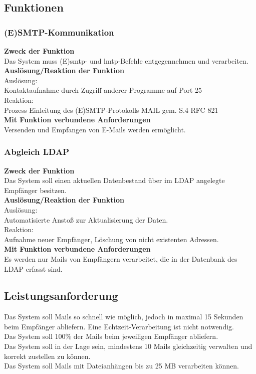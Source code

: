 \subsection{Funktionen}
\subsubsection{(E)SMTP-Kommunikation}
\textbf{Zweck der Funktion} \\
Das System muss (E)\ac{smtp}- und \ac{lmtp}-Befehle entgegennehmen und verarbeiten. \\
\textbf{Auslösung/Reaktion der Funktion} \\
Auslösung: \\
Kontaktaufnahme durch Zugriff anderer Programme auf Port 25\\
Reaktion:\\
Prozess Einleitung des (E)SMTP-Protokolls MAIL gem. S.4 RFC 821 \\
\textbf{Mit Funktion verbundene Anforderungen} \\
Versenden und Empfangen von E-Mails werden ermöglicht.\\
\subsubsection{Abgleich LDAP}
\textbf{Zweck der Funktion} \\
Das System soll einen aktuellen Datenbestand über im LDAP angelegte Empfänger besitzen.\\
\textbf{Auslösung/Reaktion der Funktion} \\
Auslösung:\\
Automatisierte Anstoß zur Aktualisierung der Daten.\\
Reaktion:\\
Aufnahme neuer Empfänger, Löschung von nicht existenten Adressen.\\
\textbf{Mit Funktion verbundene Anforderungen}\\
Es werden nur Mails von Empfängern verarbeitet, die in der Datenbank des LDAP erfasst sind.\\
\subsection{Leistungsanforderung}
Das System soll Mails so schnell wie möglich, jedoch in maximal 15 Sekunden beim Empfänger abliefern. Eine Echtzeit-Verarbeitung ist nicht notwendig.\\
Das System soll 100\% der Mails beim jeweiligen Empfänger abliefern.\\
Das System soll in der Lage sein, mindestens 10 Mails gleichzeitig verwalten und korrekt zustellen zu können.\\
Das System soll Mails mit Dateianhängen bis zu 25 MB verarbeiten können.\\
